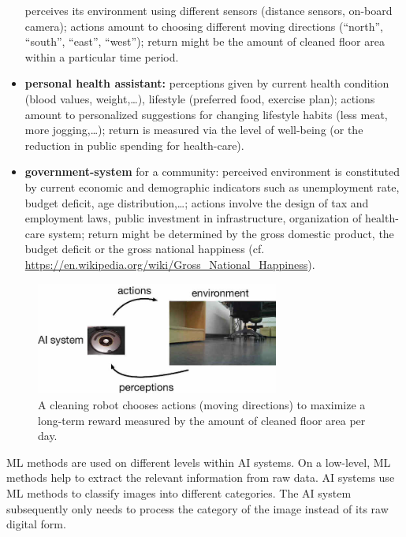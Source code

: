 \documentclass[12pt]{report}
\begin{document}
\begin{itemize}
perceives its environment using different sensors (distance sensors, 
on-board camera); actions amount to choosing different moving 
directions (``north'', ``south'', ``east'', ``west''); return might be the 
amount of cleaned floor area within a particular time period. 
\item {\bf personal health assistant:}  perceptions given by current 
health condition (blood values, weight,\ldots), lifestyle (preferred 
food, exercise plan);  actions amount to personalized suggestions 
for changing lifestyle habits (less meat, more jogging,\ldots); return 
is measured via the level of well-being (or the reduction in public 
spending for health-care).  
\item {\bf government-system} for a community: perceived environment 
is constituted by current economic and demographic indicators such as 
unemployment rate, budget deficit, age distribution,\ldots; actions involve 
the design of tax and employment laws, public investment in infrastructure, 
organization of health-care system; return might be determined by the 
gross domestic product, the budget deficit or the gross national 
happiness (cf. \url{https://en.wikipedia.org/wiki/Gross_National_Happiness}). 
\end{itemize}
	\vspace*{2mm}
\begin{figure}[htbp]
	\begin{center}
		\includegraphics[width=8cm]{AIsystemEnvML1.jpg}  
		\caption{A cleaning robot chooses actions (moving directions) to maximize 
			a long-term reward measured by the amount of cleaned floor area per day.}
		\label{fig:cleaning_robot}
	\end{center}
\end{figure}

ML methods are used on different levels within AI systems. 
On a low-level, ML methods help to extract the relevant information 
from raw data. AI systems use  ML methods to classify images into 
different categories. The AI system subsequently only needs to process 
the category of the image instead of its raw digital form. 
\end{document}

